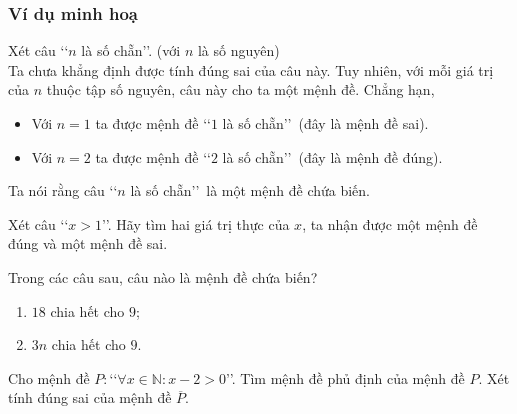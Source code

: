 \subsubsection{Ví dụ minh hoạ}

\begin{vd}%
	Xét câu \lq \lq $n$ là số chẵn\rq \rq. (với $n$ là số nguyên) \\
	Ta chưa khẳng định được tính đúng sai của câu này. Tuy nhiên, với mỗi giá trị của $n$ thuộc tập số nguyên, câu này cho ta một mệnh đề.
	Chẳng hạn,
	\begin{itemize}
		\item Với $n=1$ ta được mệnh đề \lq \lq $1$ là số chẵn\rq \rq\, (đây là mệnh đề sai).
		\item Với $n=2$ ta được mệnh đề \lq \lq $2$ là số chẵn\rq \rq\, (đây là mệnh đề đúng).
	\end{itemize}
	Ta nói rằng câu \lq \lq $n$ là số chẵn\rq \rq\, là một mệnh đề chứa biến.	
\end{vd}
\begin{vd}%
	Xét câu \lq\lq $x>1$\rq\rq. Hãy tìm hai giá trị thực của $x$, ta nhận được một mệnh đề đúng và một mệnh đề sai.
\end{vd}
\begin{vd}%
	Trong các câu sau, câu nào là mệnh đề chứa biến?
	\begin{enumerate}
		\item $18$ chia hết cho $9$;
		\item $3n$ chia hết cho $9$.
	\end{enumerate}
\end{vd}
\begin{vd}%
	Cho mệnh đề $P\colon$\lq\lq  $\forall x \in \mathbb{N}: x-2>0$\rq\rq. Tìm mệnh đề phủ định của mệnh đề $P$. Xét tính đúng sai của mệnh đề $\overline{P}$.
\end{vd}
